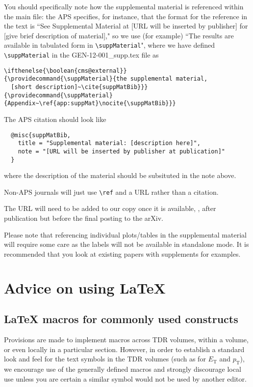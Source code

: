 You should specifically note how the supplemental material is referenced within the main file: the APS specifies, for instance, that the format for the reference in the text is ``See Supplemental Material at [URL will be inserted by publisher] for [give brief description of material]," so we use (for example) ``The results are available in tabulated form in \verb|\suppMaterial|", where we have defined \verb|\suppMaterial| in the GEN-12-001\_supp.tex file as
\begin{verbatim}
\ifthenelse{\boolean{cms@external}}
{\providecommand{\suppMaterial}{the supplemental material, 
  [short description]~\cite{suppMatBib}}}
{\providecommand{\suppMaterial}{Appendix~\ref{app:suppMat}\nocite{\suppMatBib}}}
\end{verbatim}

The APS citation should look like
\begin{verbatim}
  @misc{suppMatBib,
    title = "Supplemental material: [description here]",
    note = "[URL will be inserted by publisher at publication]"
  }
\end{verbatim}
where the description of the material should be subsituted in the note above. 

Non-APS journals will just use \verb|\ref| and a URL rather than a citation.

The URL will need to be added to our copy once it is available, \ie, after publication but before the final posting to the arXiv.

Please note that referencing individual plots/tables in the supplemental material will require some care as the labels will not be available in standalone mode. It is recommended that you look at existing papers with supplements for examples.
\clearpage
\section{Advice on using \texorpdfstring{\LaTeX}{LaTeX}\label{latex}}

\subsection{\texorpdfstring{\LaTeX}{LaTeX} macros for commonly used constructs}

Provisions are made to implement macros across TDR volumes, within a
volume, or even locally in a particular section. However, in order to
establish a standard look and feel for the text symbols in the TDR
volumes
(such  as for $E_\text{T}$ and $p_\text{T}$),
we encourage use of the generally
defined macros and strongly discourage local use unless you are
certain a similar symbol would not be used by another editor.

